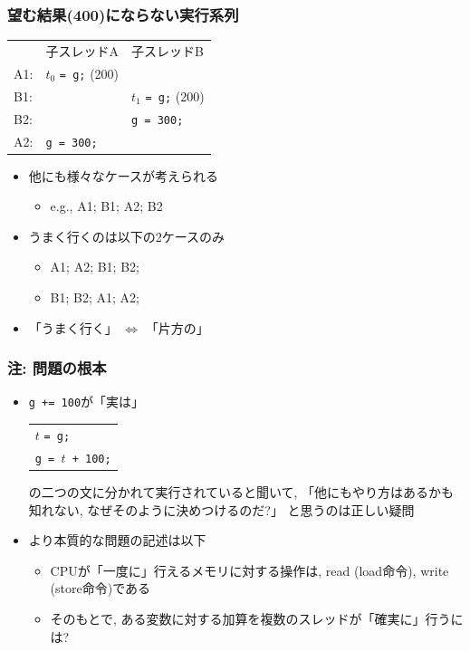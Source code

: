 \documentclass[12pt,dvipdfmx]{beamer}
\begin{document}
\begin{frame}
  \frametitle{望む結果(400)にならない実行系列}
  \begin{center}
\begin{tabular}{l|l|l}
    & 子スレッドA                   &  子スレッドB                   \\
A1: & $t_0$ {\tt = g;} (200)       &                                \\
B1: &                               &  $t_1$ {\tt = g}{\tt ;} (200)  \\
B2: &                               &  {\tt g = 300;}                \\
A2: &  {\tt g = 300;}               &                                \\
\end{tabular}
  \end{center}

\begin{itemize}
\item 他にも様々なケースが考えられる
  \begin{itemize}
  \item e.g., A1; B1; A2; B2
  \end{itemize}
\item うまく行くのは以下の2ケースのみ
  \begin{itemize}
  \item A1; A2; B1; B2;
  \item B1; B2; A1; A2;
  \end{itemize}

\item 「うまく行く」
  $\iff$ 「片方の」
\end{itemize}
\end{frame}

\begin{frame}
  \frametitle{注: 問題の根本}
  \begin{itemize}
  \item {\tt g += 100}が「実は」

    \begin{tabular}{l}
      $t$ {\tt = g;} \\
      {\tt g = $t$ + 100;} \\
    \end{tabular}

    の二つの文に分かれて実行されていると聞いて,
    「他にもやり方はあるかも知れない, なぜそのように決めつけるのだ?」
    と思うのは正しい疑問
    
  \item より本質的な問題の記述は以下
    \begin{itemize}
    \item CPUが「一度に」行えるメモリに対する操作は,  read (load命令),
      write (store命令)である
    \item そのもとで,
      ある変数に対する加算を複数のスレッドが「確実に」行うには?
    \end{itemize}
  \end{itemize}
\end{frame}
\end{document}
